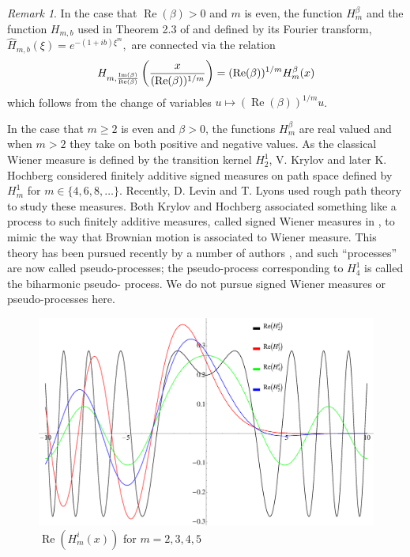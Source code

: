 \documentclass{article}
\theoremstyle{theorem}
\theoremstyle{remark}
\newtheorem{remark}{Remark}
\renewcommand\Re{\operatorname{Re}}%
\renewcommand\Im{\operatorname{Im}}
\begin{document}
\begin{remark}
In the case that $\Re(\beta)>0$ and $m$ is even, the
function $H_m^{\beta}$ and the function $H_{m,b}$ used in Theorem 2.3 of
\cite{DSC1} and defined by its Fourier transform,
$\hat{H}_{m,b}(\xi)=e^{-(1+ib)\xi^m},$ are connected via the relation
\begin{equation*}
H_{m,\frac{\Im(\beta)}{\Re(\beta)}}\left(\frac{x}{(\Re(\beta))^{1/m}}
\right)=(\Re(\beta))^{1/m}H_m^{\beta}(x)\\
\end{equation*}
which follows from the change of variables $u\mapsto (\Re(\beta))^{1/m}u$.
\end{remark}

\noindent In the case that $m\geq 2$ is even and $\beta>0$, the functions $H_m^{\beta}$ are real valued and when $m>2$ they take on both positive and negative values. As the classical Wiener measure is defined by the transition kernel $H_2^{1}$, V. Krylov \cite{Krylov1960} and later K. Hochberg \cite{Hochberg1978} considered finitely additive signed measures on path space defined by $H_m^{1}$ for $m\in\{4,6,8,\dots\}$. Recently, D. Levin and T. Lyons \cite{LevinLyons2009} used rough path theory to study these measures. Both Krylov and Hochberg associated something like a process to such finitely additive measures, called signed Wiener measures in \cite{Hochberg1978}, to mimic the way that Brownian motion is associated to Wiener measure. This theory has been pursued recently by a number of authors \cite{HochbergOrsingher1996, Lachal2007, Lachal2012, Nishioka1996, Sato2002}, and such ``processes'' are now called pseudo-processes; the pseudo-process corresponding to $H_4^1$ is called the biharmonic pseudo-
process. We do not pursue signed Wiener measures or pseudo-processes here.\\


\begin{figure}[h!]
\centering\includegraphics[width=5in]{HGraph.eps}
\caption{$\Re(H_m^i(x))$ for $m=2,3,4,5$}
\label{fig:Hgraph}
\end{figure} 
\end{document}
